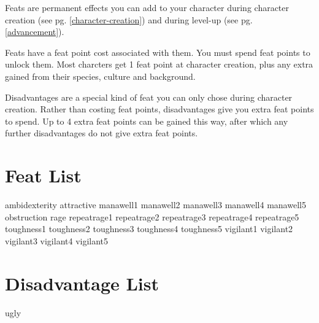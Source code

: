 \begin{multicols*}{2}
    Feats are permanent effects you can add to your character during character
    creation (see pg. \ref{character-creation}) and during level-up (see pg.
    \ref{advancement}).

    Feats have a feat point cost associated with them. You must spend feat
    points to unlock them. Most charcters get 1 feat point at character
    creation, plus any extra gained from their species, culture and background.

    Disadvantages are a special kind of feat you can only chose during
    character creation. Rather than costing feat points, disadvantages give you
    extra feat points to spend. Up to 4 extra feat points can be gained this
    way, after which any further disadvantages do not give extra feat points.

    \section{Feat List}
    {ambidexterity}
    {attractive}
    {manawell1}
    {manawell2}
    {manawell3}
    {manawell4}
    {manawell5}
    {obstruction}
    {rage}
    {repeatrage1}
    {repeatrage2}
    {repeatrage3}
    {repeatrage4}
    {repeatrage5}
    {toughness1}
    {toughness2}
    {toughness3}
    {toughness4}
    {toughness5}
    {vigilant1}
    {vigilant2}
    {vigilant3}
    {vigilant4}
    {vigilant5}

    \section{Disadvantage List}
    {ugly}

\end{multicols*}
